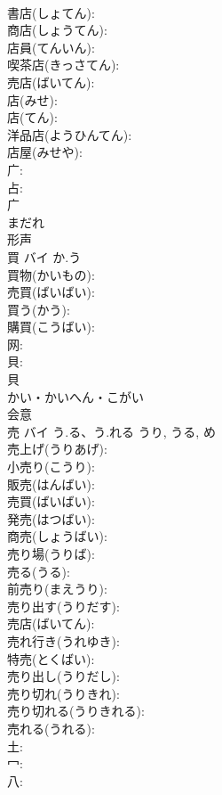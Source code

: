 \documentclass[8pt]{extreport}
\begin{document}
\begin{CJK}{UTF8}{min}
\\	書店(しょてん): 
\\	商店(しょうてん): 
\\	店員(てんいん): 
\\	喫茶店(きっさてん): 
\\	売店(ばいてん): 
\\	店(みせ): 
\\	店(てん): 
\\	洋品店(ようひんてん): 
\\	店屋(みせや): 
\\	广: 
\\	占: 
\\	广	
\\	まだれ	
\\	形声 
\\	買	バイ	か.う		
\\	買物(かいもの): 
\\	売買(ばいばい): 
\\	買う(かう): 
\\	購買(こうばい): 
\\	网: 
\\	貝: 
\\	貝	
\\	かい・かいへん・こがい	
\\	会意 
\\	売	バイ	う.る、う.れる	うり, うる, め	
\\	売上げ(うりあげ): 
\\	小売り(こうり): 
\\	販売(はんばい): 
\\	売買(ばいばい): 
\\	発売(はつばい): 
\\	商売(しょうばい): 
\\	売り場(うりば): 
\\	売る(うる): 
\\	前売り(まえうり): 
\\	売り出す(うりだす): 
\\	売店(ばいてん): 
\\	売れ行き(うれゆき): 
\\	特売(とくばい): 
\\	売り出し(うりだし): 
\\	売り切れ(うりきれ): 
\\	売り切れる(うりきれる): 
\\	売れる(うれる): 
\\	土: 
\\	冖: 
\\	八: 

\end{CJK}
\end{document}
